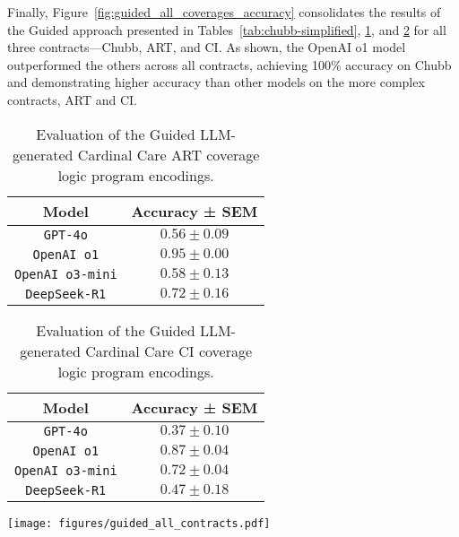 Finally, Figure~\ref{fig:guided_all_coverages_accuracy} consolidates the results of the Guided approach presented in Tables~\ref{tab:chubb-simplified}, \ref{tab:art}, and \ref{tab:comprehensive} for all three contracts—Chubb, ART, and CI. As shown, the OpenAI o1 model outperformed the others across all contracts, achieving 100\% accuracy on Chubb and demonstrating higher accuracy than other models on the more complex contracts, ART and CI.
%
\begin{table}
  \centering
  \begin{tabular}{|c|c|}
    \hline
    Model & Accuracy ± SEM \\
    \hline
    \verb|GPT-4o|     & $0.56 \pm  0.09$         \\ \hline
    \verb|OpenAI o1|     & $0.95 \pm  0.00$          \\ \hline
    \verb|OpenAI o3-mini|     & $0.58 \pm  0.13$      \\ \hline
    \verb|DeepSeek-R1|     & $0.72 \pm 0.16$
        \\\hline
  \end{tabular}
  \caption{Evaluation of the Guided LLM-generated Cardinal Care ART coverage logic program encodings.}
  \label{tab:art}
\end{table}

\begin{table}
  \centering
  \begin{tabular}{|c|c|}
    \hline
     Model & Accuracy ± SEM \\
    \hline
    \verb|GPT-4o|     & $0.37 \pm  0.10$         \\ \hline
    \verb|OpenAI o1|     & $0.87 \pm  0.04$          \\ \hline
    \verb|OpenAI o3-mini|     & $0.72 \pm  0.04$    \\ \hline
    \verb|DeepSeek-R1|     & $0.47 \pm 0.18$
        \\\hline
  \end{tabular}
  \caption{Evaluation of the Guided LLM-generated Cardinal Care CI coverage logic program encodings.}
  \label{tab:comprehensive}
\end{table}

\begin{figure*}[ht]
    \centering
   \texttt{[image: figures/guided\_all\_contracts.pdf]}
   \caption{LLMs' average accuracy for Chubb, ART, and CI coverages using Guided approach. Error bars represent the standard error of the mean across 10 trials. Models used are Deepseek-R1, GPT-4o, OpenAI o1, and o3-mini.}
   \label{fig:guided_all_coverages_accuracy}
\end{figure*}


